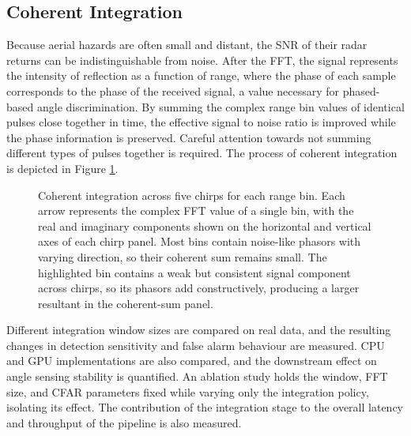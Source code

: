 \subsection{Coherent Integration}
Because aerial hazards are often small and distant, the SNR of their radar returns can be indistinguishable from noise. After the FFT, the signal represents the intensity of reflection as a function of range, where the phase of each sample corresponds to the phase of the received signal, a value necessary for phased-based angle discrimination. By summing the complex range bin values of identical pulses close together in time, the effective signal to noise ratio is improved while the phase information is preserved. Careful attention towards not summing different types of pulses together is required. The process of coherent integration is depicted in Figure \ref{fig:coherent integration}. 

\begin{figure}[htbp]
    \centering
    \caption{Coherent integration across five chirps for each range bin. Each arrow represents the complex FFT value of a single bin, with the real and imaginary components shown on the horizontal and vertical axes of each chirp panel. Most bins contain noise-like phasors with varying direction, so their coherent sum remains small. The highlighted bin contains a weak but consistent signal component across chirps, so its phasors add constructively, producing a larger resultant in the coherent-sum panel.}
    \label{fig:coherent integration}
\end{figure}

Different integration window sizes are compared on real data, and the resulting changes in detection sensitivity and false alarm behaviour are measured. CPU and GPU implementations are also compared, and the downstream effect on angle sensing stability is quantified. An ablation study holds the window, FFT size, and CFAR parameters fixed while varying only the integration policy, isolating its effect. The contribution of the integration stage to the overall latency and throughput of the pipeline is also measured. 